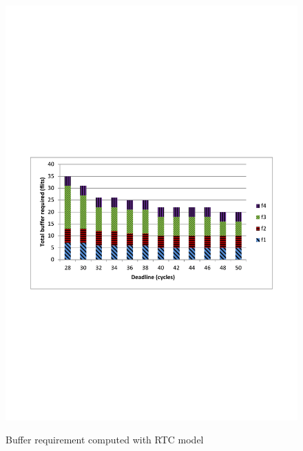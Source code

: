 \documentclass[preprint]{elsarticle}
\begin{document}
\begin{figure}
  \centering
  \includegraphics[scale=0.5]{figures/bufopt.pdf}\\
  \caption{Buffer requirement computed with RTC model}\label{LLBAvsRTC}
\end{figure}
\end{document}
